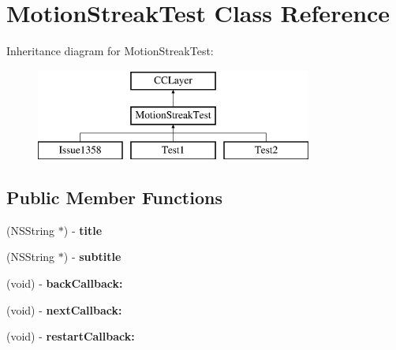 \hypertarget{interface_motion_streak_test}{\section{Motion\-Streak\-Test Class Reference}
\label{interface_motion_streak_test}
}
Inheritance diagram for Motion\-Streak\-Test\-:\begin{figure}[H]
\begin{center}
\leavevmode
\includegraphics[height=3.000000cm]{interface_motion_streak_test}
\end{center}
\end{figure}
\subsection*{Public Member Functions}
\begin{DoxyCompactItemize}
\item 
\hypertarget{interface_motion_streak_test_a23194040b4235ca84c76fe5ac5221678}{(N\-S\-String $\ast$) -\/ {\bfseries title}}\label{interface_motion_streak_test_a23194040b4235ca84c76fe5ac5221678}

\item 
\hypertarget{interface_motion_streak_test_ae538d06567d824c6604714f1bd6b65e8}{(N\-S\-String $\ast$) -\/ {\bfseries subtitle}}\label{interface_motion_streak_test_ae538d06567d824c6604714f1bd6b65e8}

\item 
\hypertarget{interface_motion_streak_test_acc8ca66f92d3f9e08fda95625e193f99}{(void) -\/ {\bfseries back\-Callback\-:}}\label{interface_motion_streak_test_acc8ca66f92d3f9e08fda95625e193f99}

\item 
\hypertarget{interface_motion_streak_test_ad5b601209eb542b6cbdcb460fe5f4796}{(void) -\/ {\bfseries next\-Callback\-:}}\label{interface_motion_streak_test_ad5b601209eb542b6cbdcb460fe5f4796}

\item 
\hypertarget{interface_motion_streak_test_aa7e320772082dcfa82433186cb99df9e}{(void) -\/ {\bfseries restart\-Callback\-:}}\label{interface_motion_streak_test_aa7e320772082dcfa82433186cb99df9e}

\end{DoxyCompactItemize}
